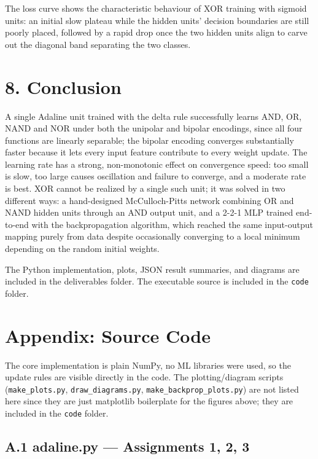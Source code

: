 \documentclass[12pt,a4paper]{article}
\begin{document}
The loss curve shows the characteristic behaviour of XOR training with sigmoid units: an initial slow plateau while the hidden units' decision boundaries are still poorly placed, followed by a rapid drop once the two hidden units align to carve out the diagonal band separating the two classes.

\section*{8. Conclusion}

A single Adaline unit trained with the delta rule successfully learns AND, OR, NAND and NOR under both the unipolar and bipolar encodings, since all four functions are linearly separable; the bipolar encoding converges substantially faster because it lets every input feature contribute to every weight update. The learning rate has a strong, non-monotonic effect on convergence speed: too small is slow, too large causes oscillation and failure to converge, and a moderate rate is best. XOR cannot be realized by a single such unit; it was solved in two different ways: a hand-designed McCulloch-Pitts network combining OR and NAND hidden units through an AND output unit, and a 2-2-1 MLP trained end-to-end with the backpropagation algorithm, which reached the same input-output mapping purely from data despite occasionally converging to a local minimum depending on the random initial weights.

The Python implementation, plots, JSON result summaries, and diagrams are included in the deliverables folder. The executable source is included in the \texttt{code} folder.

\newpage
\section*{Appendix: Source Code}

The core implementation is plain NumPy, no ML libraries were used, so the update rules are visible directly in the code. The plotting/diagram scripts (\texttt{make\_plots.py}, \texttt{draw\_diagrams.py}, \texttt{make\_backprop\_plots.py}) are not listed here since they are just matplotlib boilerplate for the figures above; they are included in the \texttt{code} folder.

\subsection*{A.1 adaline.py --- Assignments 1, 2, 3}

\end{document}
